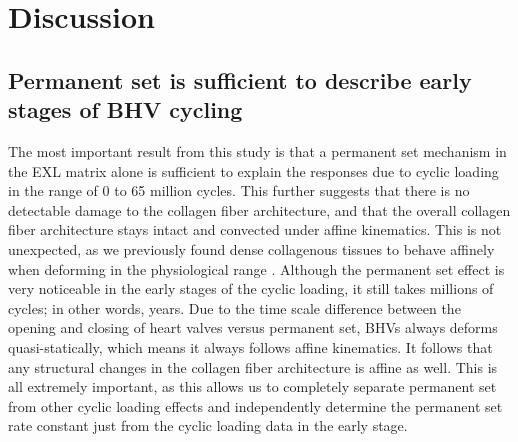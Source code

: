 

\section{Discussion}

\subsection{Permanent set is sufficient to describe early stages of BHV cycling}
	The most important result from this study is that a permanent set mechanism in the EXL matrix alone is sufficient to explain the responses due to cyclic loading in the range of 0 to 65 million cycles. 
	This further suggests that there is no detectable damage to the collagen fiber architecture, and that the overall collagen fiber architecture stays intact and convected under affine kinematics. 
	This is not unexpected, as we previously found dense collagenous tissues to behave affinely when deforming in the physiological range \cite{lee_presence_2015}. 
	Although the permanent set effect is very noticeable in the early stages of the cyclic loading, it still takes millions of cycles; in other words, years. 
	Due to the time scale difference between the opening and closing of heart valves versus permanent set, BHVs always deforms quasi-statically, which means it always follows affine kinematics. 
	It follows that any structural changes in the collagen fiber architecture is affine as well. 
	This is all extremely important, as this allows us to completely separate permanent set from other cyclic loading effects and independently determine the permanent set rate constant just from the cyclic loading data in the early stage. 

